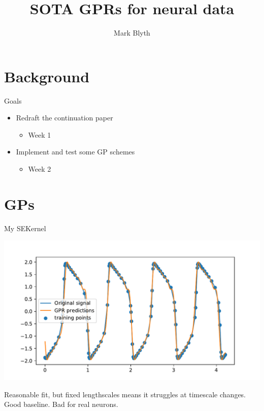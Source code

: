 \documentclass[presentation]{beamer}
\author{Mark Blyth}
\date{}
\title{SOTA GPRs for neural data}
\begin{document}
\maketitle

\section{Background}
\label{sec:orgd705aaf}
\begin{frame}[label={sec:org1b2fac8}]{Goals}
\begin{itemize}
\item Redraft the continuation paper
\begin{itemize}
\item Week 1
\end{itemize}
\item Implement and test some GP schemes
\begin{itemize}
\item Week 2
\end{itemize}
\end{itemize}
\end{frame}

\section{GPs}
\label{sec:org2322b8f}
\begin{frame}[plain,label={sec:org93e06e4}]{My SEKernel}
\begin{center}
\includegraphics[width=\textwidth]{./cosinekernel1.pdf}
\end{center}

\vfill
Reasonable fit, but fixed lengthscales means it struggles at timescale changes. Good baseline. Bad for real neurons.
\end{frame}
\end{document}
